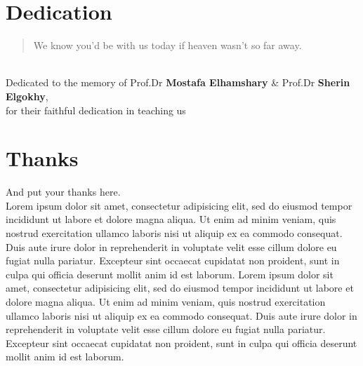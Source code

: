 \chapter*{Dedication}
\thispagestyle{empty}

\vspace*{\fill} 
\begin{quote}
\centering 
We know you’d be with us today if heaven wasn’t so far away.~\\
\end{quote}


\begin{center}
~\\
Dedicated to the memory of Prof.Dr  \textbf{Mostafa Elhamshary} \& Prof.Dr \textbf{Sherin Elgokhy}, ~\\for their faithful dedication in teaching us
\end{center}
\vspace*{\fill}



%
%
%
%

%
%
%
%
%
%
\cleardoublepage%
\chapter*{Thanks}
\thispagestyle{empty}
%
And put your thanks here. ~\\

Lorem ipsum dolor sit amet, consectetur adipisicing elit, sed do eiusmod
tempor incididunt ut labore et dolore magna aliqua. Ut enim ad minim veniam,
quis nostrud exercitation ullamco laboris nisi ut aliquip ex ea commodo
consequat. Duis aute irure dolor in reprehenderit in voluptate velit esse
cillum dolore eu fugiat nulla pariatur. Excepteur sint occaecat cupidatat non
proident, sunt in culpa qui officia deserunt mollit anim id est laborum. Lorem ipsum dolor sit amet, consectetur adipisicing elit, sed do eiusmod
tempor incididunt ut labore et dolore magna aliqua. Ut enim ad minim veniam,
quis nostrud exercitation ullamco laboris nisi ut aliquip ex ea commodo
consequat. Duis aute irure dolor in reprehenderit in voluptate velit esse
cillum dolore eu fugiat nulla pariatur. Excepteur sint occaecat cupidatat non
proident, sunt in culpa qui officia deserunt mollit anim id est laborum.